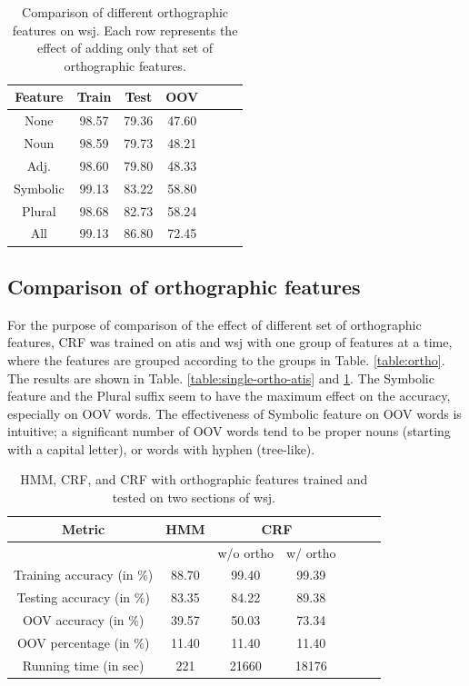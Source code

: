 \documentclass{sig-alternate-05-2015}
\begin{document}
\begin{table}[ht]
\centering
  \begin{tabular}{|c|c|c|c|c|c|c|}
	\hline 
  	{\bf Feature} & {\bf Train} & {\bf Test} & {\bf OOV}\\
  	\hline
    None & 98.57 & 79.36 & 47.60 \\
    Noun & 98.59 & 79.73 & 48.21 \\
    Adj. & 98.60 & 79.80 & 48.33 \\
    Symbolic & 99.13 & 83.22 & 58.80 \\
    Plural & 98.68 & 82.73 & 58.24 \\
    All & 99.13 & 86.80 & 72.45 \\
  \hline
  \end{tabular}
\caption{Comparison of different orthographic features on wsj. Each row represents the effect of adding only that set of orthographic features.}
\label{table:single-ortho-wsj}
\end{table}

\subsection{Comparison of orthographic features}
For the purpose of comparison of the effect of different set of orthographic features, CRF was trained on atis and wsj with one group of features at a time, where the features are grouped according to the groups in Table. \ref{table:ortho}. The results are shown in Table. \ref{table:single-ortho-atis} and \ref{table:single-ortho-wsj}. The Symbolic feature and the Plural suffix seem to have the maximum effect on the accuracy, especially on OOV words. The effectiveness of Symbolic feature on OOV words is intuitive; a significant number of OOV words tend to be proper nouns (starting with a capital letter), or words with hyphen (tree-like).

\begin{table}[ht]
\centering
  \begin{tabular}{|c|c|c|c|c|c|c|}
  	\hline
  	{\bf Metric} & {\bf HMM} & \multicolumn{2}{|c|}{{\bf CRF}} \\
	\hline 
  	& & w/o ortho & w/ ortho \\
  	\hline
 	Training accuracy (in \%) & 88.70 & 99.40 & 99.39 \\
	Testing accuracy (in \%) & 83.35 & 84.22 & 89.38\\
	OOV accuracy (in \%) & 39.57 & 50.03 & 73.34  \\
    OOV percentage (in \%) & 11.40 & 11.40 & 11.40 \\
    Running time (in sec) & 221 & 21660 & 18176\\
  \hline
  \end{tabular}
\caption{HMM, CRF, and CRF with orthographic features trained and tested on two sections of wsj.}
\label{table:two-sections}
\end{table}
\end{document}
